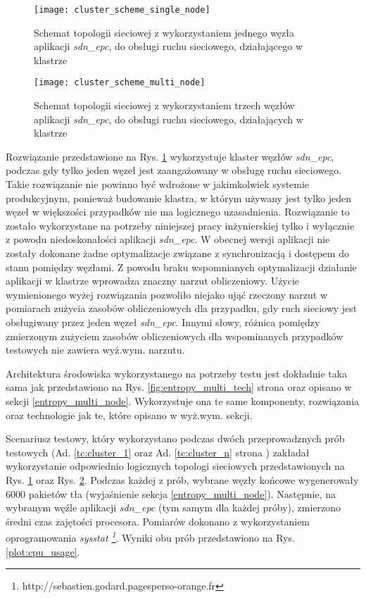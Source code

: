 \begin{figure}[h]
\centering
\texttt{[image: cluster\_scheme\_single\_node]}
\caption{Schemat topologii sieciowej z wykorzystaniem jednego węzła aplikacji
   \textit{sdn\_epc}, do obsługi ruchu sieciowego, działającego w klastrze}
\label{fig:cluster_scheme_single_node}
\end{figure}
\newpage

\begin{figure}[h]
\centering
\texttt{[image: cluster\_scheme\_multi\_node]}
\caption{Schemat topologii sieciowej z wykorzystaniem trzech węzłów aplikacji
  \textit{sdn\_epc}, do obsługi ruchu sieciowego, działających w klastrze}
\label{fig:cluster_scheme_multi_node}
\end{figure}

Rozwiązanie przedstawione na Rys. \ref{fig:cluster_scheme_single_node}
wykorzystuje klaster węzłów \textit{sdn\_epc}, podczas gdy tylko jeden węzeł
jest zaangażowany w obsługę ruchu sieciowego. Takie rozwiązanie nie powinno być
wdrożone w jakimkolwiek systemie produkcyjnym, ponieważ budowanie klastra, w
którym używany jest tylko jeden węzeł w większości przypadków nie ma logicznego
uzasadnienia. Rozwiązanie to zostało wykorzystane na potrzeby niniejszej pracy
inżynierskiej tylko i wyłącznie z powodu niedoskonałości aplikacji
\textit{sdn\_epc}. W obecnej wersji aplikacji nie zostały dokonane żadne
optymalizacje związane z synchronizacją i dostępem do stanu pomiędzy węzłami. Z
powodu braku wspomnianych optymalizacji działanie aplikacji w klastrze wprowadza
znaczny narzut obliczeniowy. Użycie wymienionego wyżej rozwiązania pozwoliło
niejako ująć rzeczony narzut w pomiarach zużycia zasobów obliczeniowych dla
przypadku, gdy ruch sieciowy jest obsługiwany przez jeden węzeł
\textit{sdn\_epc}. Innymi słowy, różnica pomiędzy zmierzonym zużyciem zasobów
obliczeniowych dla wspominanych przypadków testowych nie zawiera wyż.wym.
narzutu. 

Architektura środowiska wykorzystanego na potrzeby testu jest dokładnie taka
sama jak przedstawiono na Rys. \ref{fig:entropy_multi_tech} strona
\pageref{fig:entropy_multi_tech} oraz opisano w sekcji \ref{entropy_multi_node}.
Wykorzystuje ona te same komponenty, rozwiązania oraz technologie jak te, które
opisano w wyż.wym. sekcji.

Scenariusz testowy, który wykorzystano podczas dwóch przeprowadznych prób
testowych (Ad. \ref{tc:cluster_1} oraz Ad. \ref{tc:cluster_n} strona
\pageref{tc:cluster_1}) zakładał wykorzystanie odpowiednio logicznych topologi
sieciowych przedstawionych na Rys. \ref{fig:cluster_scheme_single_node} oraz
Rys. \ref{fig:cluster_scheme_multi_node}. Podczas każdej z prób,
wybrane węzły końcowe wygenerowały 6000 pakietów tła (wyjaśnienie sekcja
\ref{entropy_multi_node}). Następnie, na wybranym węźle aplikacji
\textit{sdn\_epc} (tym samym dla każdej próby), zmierzono średni czas zajętości
procesora. Pomiarów dokonano z wykorzystaniem oprogramowania \textit{sysstat
  \footnote{http://sebastien.godard.pagesperso-orange.fr}}. Wyniki obu prób
przedstawiono na Rys. \ref{plot:cpu_usage}.

